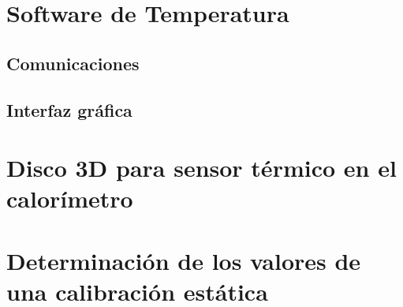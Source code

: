 	\section{Software de Temperatura}\label{anx: interfaz}
		\subsection{Comunicaciones}
			
			
		\subsection{Interfaz gr\'afica}
			
			
	\section{Disco 3D para sensor térmico en el calorímetro}
		
			
	\section{Determinación de los valores de una calibración estática}\label{anx: staticCalibration}
		